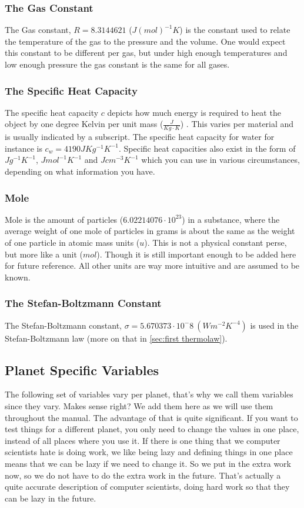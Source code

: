 \subsubsection{The Gas Constant}
The Gas constant, $R = 8.3144621$ ($J(mol)^{-1}K$) \cite{idealGas} is the constant used to relate the temperature of the gas to the pressure and the volume. One would expect this constant to be 
different per gas, but under high enough temperatures and low enough pressure the gas constant is the same for all gases. 

\subsubsection{The Specific Heat Capacity}
The specific heat capacity $c$ depicts how much energy is required to heat the object by one degree Kelvin per unit mass ($\frac{J}{Kg \cdot K}$) \cite{specificHeat}. This varies per material 
and is usually indicated by a subscript. The specific heat capacity for water for instance is $c_w = 4190  JKg^{-1}K^{-1}$. Specific heat capacities also exist in the form of $Jg^{-1}K^{-1}$, 
$Jmol^{-1}K^{-1}$ and $Jcm^{-3}K^{-1}$ which you can use in various circumstances, depending on what information you have.

\subsubsection{Mole}
Mole is the amount of particles ($6.02214076 \cdot 10^{23}$) in a substance, where the average weight of one mole of particles in grams is about the same as the weight of one particle in atomic 
mass units ($u$)\cite{mole}. This is not a physical constant perse, but more like a unit ($mol$). Though it is still important enough to be added here for future reference. All other units are 
way more intuitive and are assumed to be known.

\subsubsection{The Stefan-Boltzmann Constant}
The Stefan-Boltzmann constant, $\sigma = 5.670373 \cdot 10^-8 \ (Wm^{-2}K^{-4})$ \cite{stefan-boltzmann} is used in the Stefan-Boltzmann law (more on that in \autoref{sec:first thermolaw}). 

\subsection{Planet Specific Variables}
The following set of variables vary per planet, that's why we call them variables since they vary. Makes sense right? We add them here as we will use them throughout the manual. The advantage
of that is quite significant. If you want to test things for a different planet, you only need to change the values in one place, instead of all places where you use it. If there is one thing 
that we computer scientists hate is doing work, we like being lazy and defining things in one place means that we can be lazy if we need to change it. So we put in the extra work now, so we do 
not have to do the extra work in the future. That's actually a quite accurate description of computer scientists, doing hard work so that they can be lazy in the future.

